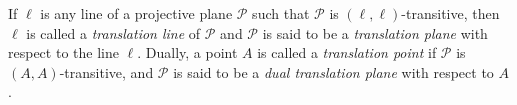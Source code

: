 If $\ell$ is any line of a projective plane $\mathcal{P}$ such that $\mathcal{P}$ is $(\ell,\ell)$-transitive, then $\ell$ is called a \emph{translation line} of $\mathcal{P}$ and $\mathcal{P}$ is said to be a \emph{translation plane} with respect to the line $\ell$. Dually, a point $A$ is called a \emph{translation point} if $\mathcal{P}$ is $(A,A)$-transitive, and $\mathcal{P}$ is said to be a \emph{dual translation plane} with respect to $A$.

